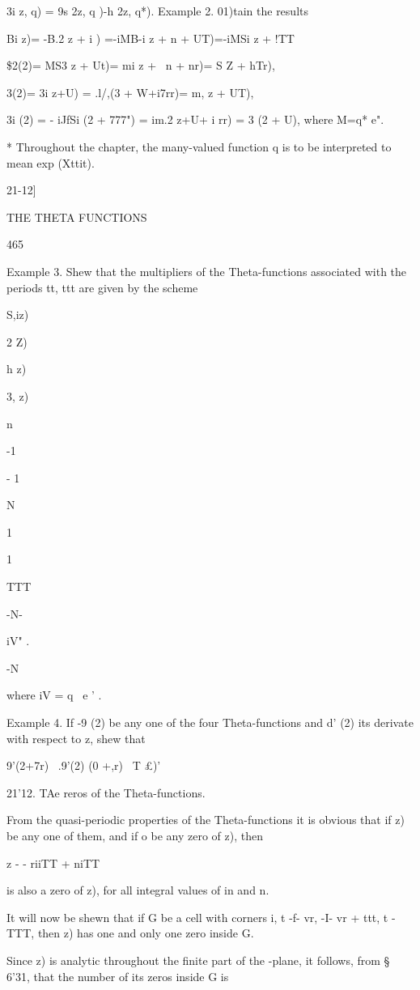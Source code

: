 3i z, q) = 9s 2z, q )-h 2z, q*). Example 2. 01)tain the results

Bi z)= -B.2 z + i ) =-iMB-i z + n + UT)=-iMSi z + !TT\

\$2(2)= MS3 z + Ut)= mi z + \ n + nr)= S Z + hTr),

 3(2)= 3i z+U) = .l/,(3 + W+i7rr)= m, z + UT),

3i (2) = - iJfSi (2 + 777") = im.2 z+U+ i rr) = 3 (2 + U), where M=q*
e".

* Throughout the chapter, the many-valued function q is to be
interpreted to mean exp (Xttit).

21-12]

THE THETA FUNCTIONS

465

Example 3. Shew that the multipliers of the Theta-functions associated
with the periods tt, ttt are given by the scheme

S,iz)

 2 Z)

h z)

3, z)

n

-1

- 1

N

1

1

TTT

-N-

iV" .

-N

where iV = q~ e ' .

Example 4. If -9 (2) be any one of the four Theta-functions and d' (2)
its derivate with respect to z, shew that

 9'(2+7r) \ .9'(2) (0 +,r) ~T £)'

21'12. TAe reros of the Theta-functions.

From the quasi-periodic properties of the Theta-functions it is
obvious that if z) be any one of them, and if o be any zero of z),
then

z - - riiTT + niTT

is also a zero of z), for all integral values of in and n.

It will now be shewn that if G be a cell with corners i, t -f- vr, -I-
vr + ttt, t - TTT, then z) has one and only one zero inside G.

Since z) is analytic throughout the finite part of the -plane, it
follows, from § 6'31, that the number of its zeros inside G is

